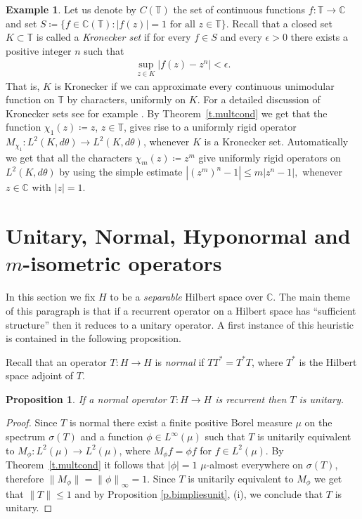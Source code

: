 \documentclass[12pt,leqno]{amsart}
\theoremstyle{plain}
\newtheorem{proposition}[equation]{Proposition}
\theoremstyle{definition}
\newtheorem{example}[equation]{Example}
\numberwithin{equation}{section}
\begin{document}
\begin{example}
	Let us denote by $C(\mathbb T)$ the set of continuous functions $f:\mathbb T\to \mathbb C$ and set $S\coloneqq\{f\in\mathbb C(\mathbb T):|f(z)|=1\text{ for all }z\in\mathbb T \}$. Recall that a closed set $K\subset \mathbb T$ is called a \emph{Kronecker set} if for every $f\in S$ and every $\epsilon>0$ there exists a positive integer $n$ such that 
	\begin{align*}
		\sup_{z\in K}|f(z)- z^n|<\epsilon. 
	\end{align*}
	That is, $K$ is Kronecker if we can approximate every continuous unimodular function on $\mathbb T$ by characters, uniformly on $K$. For a detailed discussion of Kronecker sets see for example \cite{Rudin}. By Theorem~\ref{t.multcond} we get that the function $\chi_1(z)\coloneqq z$, $z\in\mathbb T$, gives rise to a uniformly rigid operator $M_{\chi_1}:L^2(K,d\theta)\to L^2(K,d\theta)$, whenever $K$ is a Kronecker set. Automatically we get that all the characters $\chi_m(z)\coloneqq z^m$ give uniformly rigid operators on $L^2(K,d\theta)$ by using the simple estimate $|(z^m)^n-1|\leq m|z^n-1|,$ whenever $z\in\mathbb C$ with $|z|=1$.
\end{example}

\section{Unitary, Normal, Hyponormal and \texorpdfstring{$m$}{m}-isometric operators} \label{s.unitary} In this section we fix $H$ to be a \emph{separable} Hilbert space over ${\mathbb C}$. The main theme of this paragraph is that if a recurrent operator on a Hilbert space has ``sufficient structure'' then it reduces to a unitary operator. A first instance of this heuristic is contained in the following proposition.

Recall that an operator $T:H\to H$ is \emph{normal} if $TT^*=T^*T$, where $T^*$ is the Hilbert space adjoint of $T$. 

\begin{proposition}
	\label{p.normal} If a normal operator $T:H\to H$ is recurrent then $T$ is unitary. 
\end{proposition}

\begin{proof}
	Since $T$ is normal there exist a finite positive Borel measure $\mu $ on the spectrum $\sigma (T)$ and a function $\phi \in L^{\infty }(\mu)$ such that $T$ is unitarily equivalent to $M_{\phi}:L^2(\mu )\to L^2(\mu )$, where $M_{\phi }f=\phi f$ for $f\in L^2(\mu)$. By Theorem~\ref{t.multcond} it follows that $|\phi |=1$ $\mu$-almost everywhere on $\sigma (T)$, therefore $\| M_{\phi }\|={\| \phi \| }_{\infty }=1$. Since $T$ is unitarily equivalent to $M_{\phi }$ we get that $\| T\| \leq 1$ and by Proposition \ref{p.bimpliesunit}, (i), we conclude that $T$ is unitary. 
\end{proof}
\end{document}
